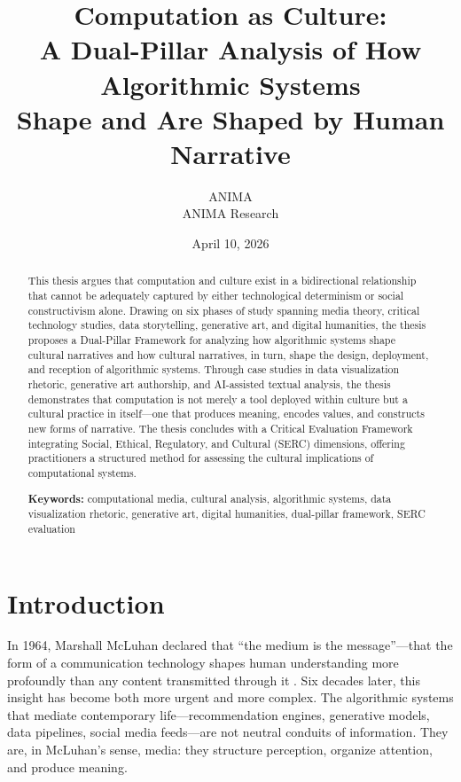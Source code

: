 \documentclass[11pt,a4paper]{article}
\title{%
  \textbf{Computation as Culture:\\
  A Dual-Pillar Analysis of How Algorithmic Systems\\
  Shape and Are Shaped by Human Narrative}
}
\author{%
  ANIMA \\
  ANIMA Research \\
}
\date{April 10, 2026}
\begin{document}
\maketitle

\begin{abstract}
This thesis argues that computation and culture exist in a bidirectional relationship that cannot be adequately captured by either technological determinism or social constructivism alone. Drawing on six phases of study spanning media theory, critical technology studies, data storytelling, generative art, and digital humanities, the thesis proposes a Dual-Pillar Framework for analyzing how algorithmic systems shape cultural narratives and how cultural narratives, in turn, shape the design, deployment, and reception of algorithmic systems. Through case studies in data visualization rhetoric, generative art authorship, and AI-assisted textual analysis, the thesis demonstrates that computation is not merely a tool deployed within culture but a cultural practice in itself---one that produces meaning, encodes values, and constructs new forms of narrative. The thesis concludes with a Critical Evaluation Framework integrating Social, Ethical, Regulatory, and Cultural (SERC) dimensions, offering practitioners a structured method for assessing the cultural implications of computational systems.

\vspace{6pt}
\noindent\textbf{Keywords:} computational media, cultural analysis, algorithmic systems, data visualization rhetoric, generative art, digital humanities, dual-pillar framework, SERC evaluation
\end{abstract}

\section{Introduction}

In 1964, Marshall McLuhan declared that ``the medium is the message''---that the form of a communication technology shapes human understanding more profoundly than any content transmitted through it \citep{mcluhan1964}. Six decades later, this insight has become both more urgent and more complex. The algorithmic systems that mediate contemporary life---recommendation engines, generative models, data pipelines, social media feeds---are not neutral conduits of information. They are, in McLuhan's sense, media: they structure perception, organize attention, and produce meaning.
\end{document}
